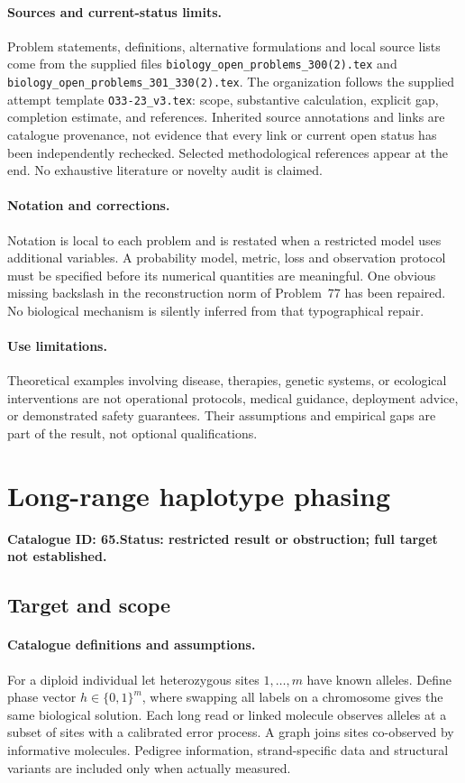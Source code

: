 \documentclass[11pt]{article}
\begin{document}
\paragraph{Sources and current-status limits.}
Problem statements, definitions, alternative formulations and local source lists
come from the supplied files
\texttt{biology\_open\_problems\_300(2).tex} and
\texttt{biology\_open\_problems\_301\_330(2).tex}.
The organization follows the supplied attempt template
\texttt{O33-23\_v3.tex}: scope, substantive calculation, explicit gap,
completion estimate, and references. Inherited source annotations and links are
catalogue provenance, not evidence that every link or current open status has
been independently rechecked. Selected methodological references appear at the
end. No exhaustive literature or novelty audit is claimed.

\paragraph{Notation and corrections.}
Notation is local to each problem and is restated when a restricted model uses
additional variables. A probability model, metric, loss and observation protocol
must be specified before its numerical quantities are meaningful. One obvious
missing backslash in the reconstruction norm of Problem~77 has been repaired.
No biological mechanism is silently inferred from that typographical repair.

\paragraph{Use limitations.}
Theoretical examples involving disease, therapies, genetic systems, or ecological
interventions are not operational protocols, medical guidance, deployment advice,
or demonstrated safety guarantees. Their assumptions and empirical gaps are part
of the result, not optional qualifications.

\setcounter{section}{64}
\section{Long-range haplotype phasing}
\label{prob:065}
\noindent\textbf{Catalogue ID: 65.}\quad \textbf{Status: restricted result or obstruction; full target not established.}
\subsection{Target and scope}
\paragraph{Catalogue definitions and assumptions.}
For a diploid individual let heterozygous sites $1,\ldots,m$ have known alleles. Define phase vector $h\in\{0,1\}^m$, where swapping all labels on a chromosome gives the same biological solution. Each long read or linked molecule observes alleles at a subset of sites with a calibrated error process. A graph joins sites co-observed by informative molecules. Pedigree information, strand-specific data and structural variants are included only when actually measured.
\end{document}
